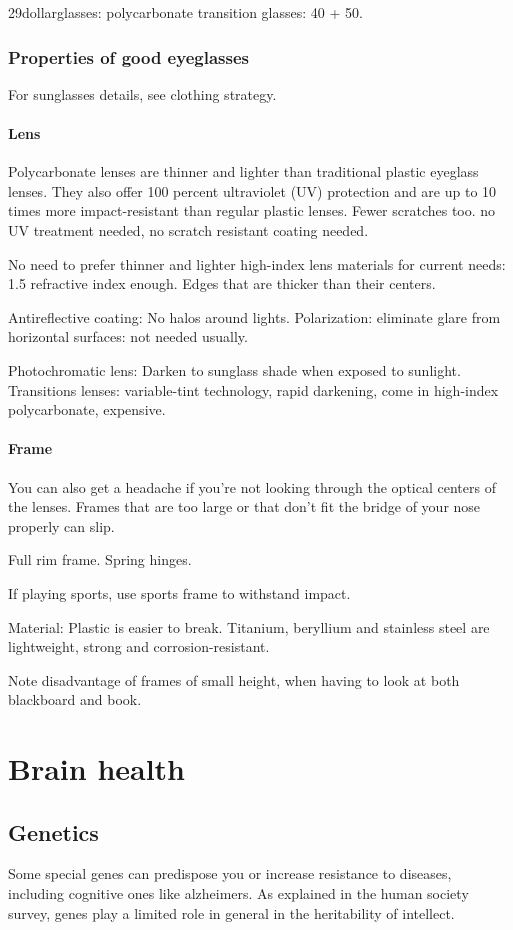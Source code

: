 \documentclass[oneside, article]{memoir}
\begin{document}
29dollarglasses: polycarbonate transition glasses: 40 + 50.

\subsection{Properties of good eyeglasses}
For sunglasses details, see clothing strategy.

\subsubsection{Lens}
Polycarbonate lenses are thinner and lighter than traditional plastic eyeglass lenses. They also offer 100 percent ultraviolet (UV) protection and are up to 10 times more impact-resistant than regular plastic lenses. Fewer scratches too. no UV treatment needed, no scratch resistant coating needed.

No need to prefer thinner and lighter high-index lens materials for current needs: 1.5 refractive index enough. Edges that are thicker than their centers.

Antireflective coating: No halos around lights. Polarization: eliminate glare from horizontal surfaces: not needed usually.

Photochromatic lens: Darken to sunglass shade when exposed to sunlight. Transitions lenses: variable-tint technology, rapid darkening, come in high-index polycarbonate, expensive.

\subsubsection{Frame}

You can also get a headache if you're not looking through the optical centers of the lenses. Frames that are too large or that don't fit the bridge of your nose properly can slip.

Full rim frame. Spring hinges.

If playing sports, use sports frame to withstand impact.

Material: Plastic is easier to break. Titanium, beryllium and stainless steel are lightweight, strong and corrosion-resistant.

Note disadvantage of frames of small height, when having to look at both blackboard and book.

\chapter{Brain health}
\section{Genetics}
Some special genes can predispose you or increase resistance to diseases, including cognitive ones like alzheimers. As explained in the human society survey, genes play a limited role in general in the heritability of intellect.
\end{document}

